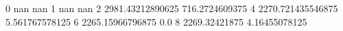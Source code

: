 0 nan nan
1 nan nan
2 2981.43212890625 716.2724609375
4 2270.721435546875 5.561767578125
6 2265.15966796875 0.0
8 2269.32421875 4.16455078125
